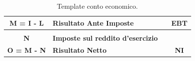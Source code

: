 \documentclass{article}
\begin{document}
\begin{table}[ht]
{\begin{tabular}{|c|l|c|c|}
            \hline
            \textbf{M = I - L} & \textbf{Risultato Ante Imposte}                                                     &                     & \textbf{EBT}    \\
            \hline
                               &                                                                                     &                     &                 \\
            \textbf{N}         & \textbf{Imposte sul reddito d'esercizio}                                            &                     &                 \\
            \hline
            \textbf{O = M - N} & \textbf{Risultato Netto}                                                            &                     & \textbf{NI}     \\
            \hline
        \end{tabular}
    }
    \caption{Template conto economico.}
\end{table}

\newpage %
\end{document}
